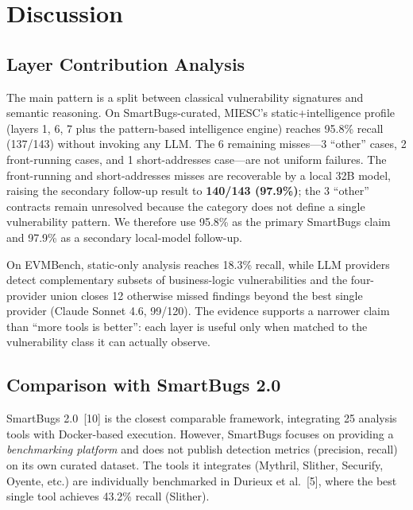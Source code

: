 \documentclass[conference]{IEEEtran}
\begin{document}
\section{Discussion}

\subsection{Layer Contribution Analysis}

The main pattern is a split between classical vulnerability signatures and semantic reasoning. On SmartBugs-curated, MIESC's static+intelligence profile (layers 1, 6, 7 plus the pattern-based intelligence engine) reaches 95.8\% recall (137/143) without invoking any LLM. The 6 remaining misses---3 ``other'' cases, 2 front-running cases, and 1 short-addresses case---are not uniform failures. The front-running and short-addresses misses are recoverable by a local 32B model, raising the secondary follow-up result to \textbf{140/143 (97.9\%)}; the 3 ``other'' contracts remain unresolved because the category does not define a single vulnerability pattern. We therefore use 95.8\% as the primary SmartBugs claim and 97.9\% as a secondary local-model follow-up.

On EVMBench, static-only analysis reaches 18.3\% recall, while LLM providers detect complementary subsets of business-logic vulnerabilities and the four-provider union closes 12 otherwise missed findings beyond the best single provider (Claude Sonnet 4.6, 99/120). The evidence supports a narrower claim than ``more tools is better'': each layer is useful only when matched to the vulnerability class it can actually observe.

\subsection{Comparison with SmartBugs 2.0}

SmartBugs 2.0~[10] is the closest comparable framework, integrating 25 analysis tools with Docker-based execution. However, SmartBugs focuses on providing a \emph{benchmarking platform} and does not publish detection metrics (precision, recall) on its own curated dataset. The tools it integrates (Mythril, Slither, Securify, Oyente, etc.) are individually benchmarked in Durieux et al.~[5], where the best single tool achieves 43.2\% recall (Slither).
\end{document}
